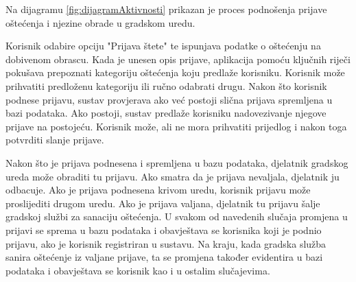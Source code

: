 			Na dijagramu \ref{fig:dijagramAktivnosti} prikazan je proces podnošenja prijave oštećenja i njezine obrade u gradskom uredu. 
			
			Korisnik odabire opciju "Prijava štete" te ispunjava podatke o oštećenju na dobivenom obrascu. Kada je unesen opis prijave, aplikacija pomoću ključnih riječi pokušava prepoznati kategoriju oštećenja koju predlaže korisniku. Korisnik može prihvatiti predloženu kategoriju ili ručno odabrati drugu. Nakon što korisnik podnese prijavu, sustav provjerava ako već postoji slična prijava spremljena u bazi podataka. Ako postoji, sustav predlaže korisniku nadovezivanje njegove prijave na postojeću. Korisnik može, ali ne mora prihvatiti prijedlog i nakon toga potvrditi slanje prijave.
			
			Nakon što je prijava podnesena i spremljena u bazu podataka, djelatnik gradskog ureda može obraditi tu prijavu. Ako smatra da je prijava nevaljala, djelatnik ju odbacuje. Ako je prijava podnesena krivom uredu, korisnik prijavu može proslijediti drugom uredu. Ako je prijava valjana, djelatnik tu prijavu šalje gradskoj službi za sanaciju oštećenja. U svakom od navedenih slučaja promjena u prijavi se sprema u bazu podataka i obavještava se korisnika koji je podnio prijavu, ako je korisnik registriran u sustavu. Na kraju, kada gradska služba sanira oštećenje iz valjane prijave, ta se promjena također evidentira u bazi podataka i obavještava se korisnik kao i u ostalim slučajevima. 
			
